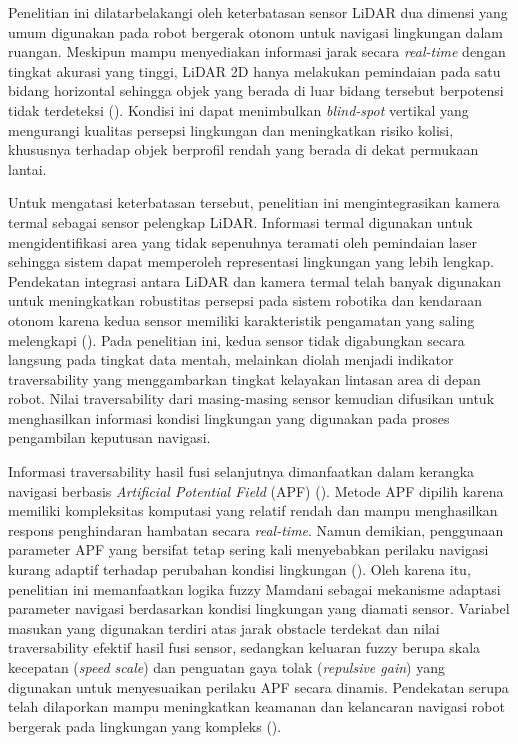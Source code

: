 Penelitian ini dilatarbelakangi oleh keterbatasan sensor LiDAR dua dimensi yang umum digunakan pada robot bergerak otonom untuk navigasi lingkungan dalam ruangan. Meskipun mampu menyediakan informasi jarak secara \textit{real-time} dengan tingkat akurasi yang tinggi, LiDAR 2D hanya melakukan pemindaian pada satu bidang horizontal sehingga objek yang berada di luar bidang tersebut berpotensi tidak terdeteksi (\cite{Fagundes2024,Kibii2022}). Kondisi ini dapat menimbulkan \textit{blind-spot} vertikal yang mengurangi kualitas persepsi lingkungan dan meningkatkan risiko kolisi, khususnya terhadap objek berprofil rendah yang berada di dekat permukaan lantai.

Untuk mengatasi keterbatasan tersebut, penelitian ini mengintegrasikan kamera termal sebagai sensor pelengkap LiDAR. Informasi termal digunakan untuk mengidentifikasi area yang tidak sepenuhnya teramati oleh pemindaian laser sehingga sistem dapat memperoleh representasi lingkungan yang lebih lengkap. Pendekatan integrasi antara LiDAR dan kamera termal telah banyak digunakan untuk meningkatkan robustitas persepsi pada sistem robotika dan kendaraan otonom karena kedua sensor memiliki karakteristik pengamatan yang saling melengkapi (\cite{Choi2023,Schichler2025}). Pada penelitian ini, kedua sensor tidak digabungkan secara langsung pada tingkat data mentah, melainkan diolah menjadi indikator traversability yang menggambarkan tingkat kelayakan lintasan area di depan robot. Nilai traversability dari masing-masing sensor kemudian difusikan untuk menghasilkan informasi kondisi lingkungan yang digunakan pada proses pengambilan keputusan navigasi.

Informasi traversability hasil fusi selanjutnya dimanfaatkan dalam kerangka navigasi ber\-basis \textit{Artificial Potential Field} (APF) (\cite{Khatib1986}). Metode APF dipilih karena memiliki kompleksitas komputasi yang relatif rendah dan mampu menghasilkan respons penghindaran hambatan secara \textit{real-time}. Namun demikian, penggunaan parameter APF yang bersifat tetap sering kali menyebabkan perilaku navigasi kurang adaptif terhadap perubahan kondisi lingkungan (\cite{Lv2024}). Oleh karena itu, penelitian ini memanfaatkan logika fuzzy Mamdani sebagai mekanisme adaptasi parameter navigasi berdasarkan kondisi lingkungan yang diamati sensor. Variabel masukan yang digunakan terdiri atas jarak obstacle terdekat dan nilai traversability efektif hasil fusi sensor, sedangkan keluaran fuzzy berupa skala kecepatan (\textit{speed scale}) dan penguatan gaya tolak (\textit{repulsive gain}) yang digunakan untuk menyesuaikan perilaku APF secara dinamis. Pendekatan serupa telah dilaporkan mampu meningkatkan keamanan dan kelancaran navigasi robot bergerak pada lingkungan yang kompleks (\cite{Haider2022,Benaicha2026}).

